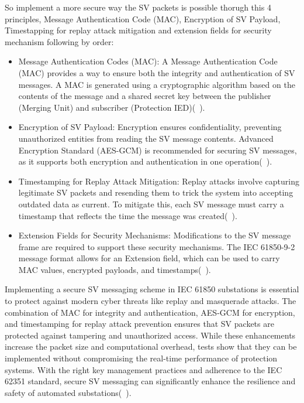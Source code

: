 So implement a more secure way the SV packets is possible thorugh this 4 principles, Message Authentication Code (MAC), Encryption of SV Payload, Timestapping for replay attack mitigation and extension fields for security mechanism following by order:
\begin{itemize}
	\item Message Authentication Codes (MAC): A Message Authentication Code (MAC) provides a way to ensure both the integrity and authentication of SV messages. A MAC is generated using a cryptographic algorithm based on the contents of the message and a shared secret key between the publisher (Merging Unit) and subscriber (Protection IED)(~\cite{hussain2024security}).
	\item Encryption of SV Payload: Encryption ensures confidentiality, preventing unauthorized entities from reading the SV message contents. Advanced Encryption Standard (AES-GCM) is recommended for securing SV messages, as it supports both encryption and authentication in one operation(~\cite{hussain2024security}).
	\item Timestamping for Replay Attack Mitigation: Replay attacks involve capturing legitimate SV packets and resending them to trick the system into accepting outdated data as current. To mitigate this, each SV message must carry a timestamp that reflects the time the message was created(~\cite{hussain2024security}).
	\item Extension Fields for Security Mechanisms: Modifications to the SV message frame are required to support these security mechanisms. The IEC 61850-9-2 message format allows for an Extension field, which can be used to carry MAC values, encrypted payloads, and timestamps(~\cite{hussain2024security}).
\end{itemize}

Implementing a secure SV messaging scheme in IEC 61850 substations is essential to protect against modern cyber threats like replay and masquerade attacks. The combination of MAC for integrity and authentication, AES-GCM for encryption, and timestamping for replay attack prevention ensures that SV packets are protected against tampering and unauthorized access. While these enhancements increase the packet size and computational overhead, tests show that they can be implemented without compromising the real-time performance of protection systems. With the right key management practices and adherence to the IEC 62351 standard, secure SV messaging can significantly enhance the resilience and safety of automated substations(~\cite{hussain2024security}).



